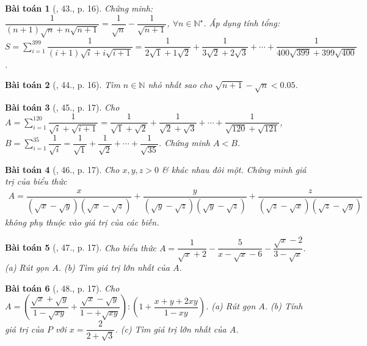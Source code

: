 \documentclass{article}
\newtheorem{baitoan}{Bài toán}
\begin{document}
\begin{baitoan}[\cite{Tuyen_Toan_9}, 43., p. 16]
	Chứng minh: $\dfrac{1}{(n + 1)\sqrt{n} + n\sqrt{n + 1}} = \dfrac{1}{\sqrt{n}} - \dfrac{1}{\sqrt{n + 1}}$, $\forall n\in\mathbb{N}^\star$. Áp dụng tính tổng: $S = \sum_{i=1}^{399} \dfrac{1}{(i + 1)\sqrt{i} + i\sqrt{i + 1}} = \dfrac{1}{2\sqrt{1} + 1\sqrt{2}} + \dfrac{1}{3\sqrt{2} + 2\sqrt{3}} + \cdots + \dfrac{1}{400\sqrt{399} + 399\sqrt{400}}$.
\end{baitoan}

\begin{baitoan}[\cite{Tuyen_Toan_9}, 44., p. 16]
	Tìm $n\in\mathbb{N}$ nhỏ nhất sao cho $\sqrt{n + 1} - \sqrt{n} < 0.05$.
\end{baitoan}

\begin{baitoan}[\cite{Tuyen_Toan_9}, 45., p. 17]
	Cho $A = \sum_{i=1}^{120} \dfrac{1}{\sqrt{i} + \sqrt{i + 1}} = \dfrac{1}{\sqrt{1} + \sqrt{2}} + \dfrac{1}{\sqrt{2} + \sqrt{3}} + \cdots + \dfrac{1}{\sqrt{120} + \sqrt{121}}$, $B = \sum_{i=1}^{35} \dfrac{1}{\sqrt{i}} = \dfrac{1}{\sqrt{1}} + \dfrac{1}{\sqrt{2}} + \cdots + \dfrac{1}{\sqrt{35}}$. Chứng minh $A < B$.
\end{baitoan}

\begin{baitoan}[\cite{Tuyen_Toan_9}, 46., p. 17]
	Cho $x,y,z > 0$ \& khác nhau đôi một. Chứng minh giá trị của biểu thức
	\begin{align*}
		A = \dfrac{x}{(\sqrt{x} - \sqrt{y})(\sqrt{x} - \sqrt{z})} + \dfrac{y}{(\sqrt{y} - \sqrt{z})(\sqrt{y} - \sqrt{z})} + \dfrac{z}{(\sqrt{z} - \sqrt{x})(\sqrt{z} - \sqrt{y})}
	\end{align*}
	không phụ thuộc vào giá trị của các biến.
\end{baitoan}

\begin{baitoan}[\cite{Tuyen_Toan_9}, 47., p. 17]
	Cho biểu thức $A = \dfrac{1}{\sqrt{x} + 2} - \dfrac{5}{x - \sqrt{x} - 6} - \dfrac{\sqrt{x} - 2}{3 - \sqrt{x}}$. (a) Rút gọn $A$. (b) Tìm giá trị lớn nhất của $A$.
\end{baitoan}

\begin{baitoan}[\cite{Tuyen_Toan_9}, 48., p. 17]
	Cho $A = \left(\dfrac{\sqrt{x} + \sqrt{y}}{1 - \sqrt{xy}} + \dfrac{\sqrt{x} - \sqrt{y}}{1 -+ \sqrt{xy}}\right):\left(1 + \dfrac{x + y + 2xy}{1 - xy}\right)$. (a) Rút gọn $A$. (b) Tính giá trị của $P$ với $x = \dfrac{2}{2 + \sqrt{3}}$. (c) Tìm giá trị lớn nhất của $A$.
\end{baitoan}
\end{document}
